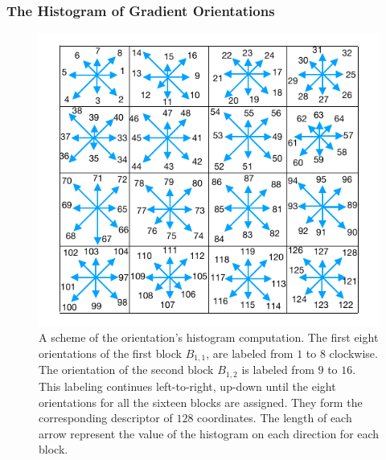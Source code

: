 \documentclass[aspectratio=169]{beamer}
\begin{document}
\begin{frame}
\frametitle{The Histogram of Gradient Orientations}
\begin{center}
\begin{figure}[h!]
\centering
\includegraphics[scale=0.8]{images/gradientorientations.pdf}
\caption[Gradient Orientations Numbering]{A scheme of the orientation's histogram computation. The first eight orientations of the first block $ B_{1,1} $, are labeled from $1$ to $8$ clockwise. The orientation of the second block $ B_{1,2} $ is labeled from $9$ to $16$.  This labeling continues left-to-right, up-down until the eight orientations for all the sixteen blocks are assigned. They form the corresponding descriptor of $128$ coordinates.  The length of each arrow represent the value of the histogram on each direction for each block.}
\label{fig:orientationsfull}
\end{figure}
\end{center}
\end{frame}
\end{document}
